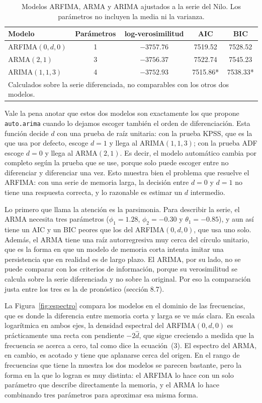 \documentclass[legalpaper,11pt]{article}
\begin{document}
\begin{enumerate}
\begin{table}[H]
\centering
\begin{tabular}{lcccc}
\hline
\textbf{Modelo} & \textbf{Par\'ametros} & \textbf{log-verosimilitud} & \textbf{AIC} & \textbf{BIC} \\
\hline
ARFIMA$(0,d,0)$ & 1 & $-3757.76$ & 7519.52 & 7528.52 \\
ARMA$(2,1)$ & 3 & $-3756.37$ & 7522.74 & 7545.23 \\
ARIMA$(1,1,3)$ & 4 & $-3752.93$ & 7515.86* & 7538.33* \\
\hline
\multicolumn{5}{l}{\footnotesize * Calculados sobre la serie diferenciada, no comparables con los otros dos modelos.}
\end{tabular}
\caption{Modelos ARFIMA, ARMA y ARIMA ajustados a la serie del Nilo. Los par\'ametros no incluyen la media ni la varianza.}
\label{tab:comparacion}
\end{table}
Vale la pena anotar que estos dos modelos son exactamente los que propone \texttt{auto.arima} cuando lo dejamos escoger tambi\'en el orden de diferenciaci\'on. Esta funci\'on decide $d$ con una prueba de ra\'iz unitaria: con la prueba KPSS, que es la que usa por defecto, escoge $d = 1$ y llega al ARIMA$(1,1,3)$; con la prueba ADF escoge $d = 0$ y llega al ARMA$(2,1)$. Es decir, el modelo autom\'atico cambia por completo seg\'un la prueba que se use, porque solo puede escoger entre no diferenciar y diferenciar una vez. Esto muestra bien el problema que resuelve el ARFIMA: con una serie de memoria larga, la decisi\'on entre $d = 0$ y $d = 1$ no tiene una respuesta correcta, y lo razonable es estimar un $d$ intermedio.

Lo primero que llama la atenci\'on es la parsimonia. Para describir la serie, el ARMA necesita tres par\'ametros ($\phi_1 = 1.28$, $\phi_2 = -0.30$ y $\theta_1 = -0.85$), y aun as\'i tiene un AIC y un BIC peores que los del ARFIMA$(0,d,0)$, que usa uno solo. Adem\'as, el ARMA tiene una ra\'iz autorregresiva muy cerca del c\'irculo unitario, que es la forma en que un modelo de memoria corta intenta imitar una persistencia que en realidad es de largo plazo. El ARIMA, por su lado, no se puede comparar con los criterios de informaci\'on, porque su verosimilitud se calcula sobre la serie diferenciada y no sobre la original. Por eso la comparaci\'on justa entre los tres es la de pron\'ostico (secci\'on 8.7).

La Figura~\ref{fig:espectro} compara los modelos en el dominio de las frecuencias, que es donde la diferencia entre memoria corta y larga se ve m\'as clara. En escala logar\'itmica en ambos ejes, la densidad espectral del ARFIMA$(0,d,0)$ es pr\'acticamente una recta con pendiente $-2\hat d$, que sigue creciendo a medida que la frecuencia se acerca a cero, tal como dice la ecuaci\'on~(3). El espectro del ARMA, en cambio, es acotado y tiene que aplanarse cerca del origen. En el rango de frecuencias que tiene la muestra los dos modelos se parecen bastante, pero la forma en la que lo logran es muy distinta: el ARFIMA lo hace con un solo par\'ametro que describe directamente la memoria, y el ARMA lo hace combinando tres par\'ametros para aproximar esa misma forma.


\end{enumerate}
\end{document}
